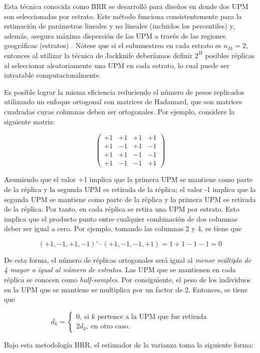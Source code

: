\documentclass[
  12pt,
]{book}
\begin{document}
Esta técnica conocida como BRR se desarrolló para diseños en donde dos UPM son seleccionadas por estrato. Este método funciona consistentemente para la estimación de parámetros lineales y no lineales (incluidos los percentiles) y, además, asegura máxima dispersión de las UPM a través de las regiones geográficas (estratos) \citep{Valliant_Dever_2017}. Nótese que si el submuestreo en cada estrato es \(n_{Ih} = 2\), entonces al utilizar la técnica de Jackknife deberíamos definir \(2^H\) posibles réplicas al seleccionar aleatoriamente una UPM en cada estrato, lo cual puede ser intratable computacionalmente.

Es posible lograr la misma eficiencia reduciendo el número de pesos replicados utilizando un enfoque ortogonal con matrices de Hadamard, que son matrices cuadradas cuyas columnas deben ser ortogonales. Por ejemplo, considere la siguiente matriz:

\[
\begin{pmatrix}
+1 & +1 & +1 & +1 \\
+1 & -1 & +1 & -1 \\
+1 & +1 & -1 & -1 \\
+1 & -1 & -1 & +1
\end{pmatrix}
\]

Asumiendo que el valor +1 implica que la primera UPM se mantiene como parte de la réplica y la segunda UPM es retirada de la réplica; el valor -1 implica que la segunda UPM se mantiene como parte de la réplica y la primera UPM es retirada de la réplica. Por tanto, en cada réplica se retira una UPM por estrato. Esto implica que el producto punto entre cualquier combinación de dos columnas deber ser igual a cero. Por ejemplo, tomando las columnas 2 y 4, se tiene que

\[
(+1, -1, +1, -1)' \cdot (+1, -1, -1, +1) 
=  1 + 1 - 1 -1 = 0 
\]

De esta forma, el número de réplicas ortogonales será igual al \emph{menor múltiplo de 4 mayor o igual al número de estratos}. Las UPM que se mantienen en cada réplica se conocen como \emph{half-samples}. Por consiguiente, el peso de los individuos en la UPM que se mantiene se multiplica por un factor de 2. Entonces, se tiene que

\[
d_{k} = 
\begin{cases}
0, \ \text{si $k$ pertence a la UPM que fue retirada}\\
2d_k, \ \text{en otro caso.}
\end{cases}
\]

Bajo esta metodología BRR, el estimador de la varianza toma la siguiente forma:
\end{document}
